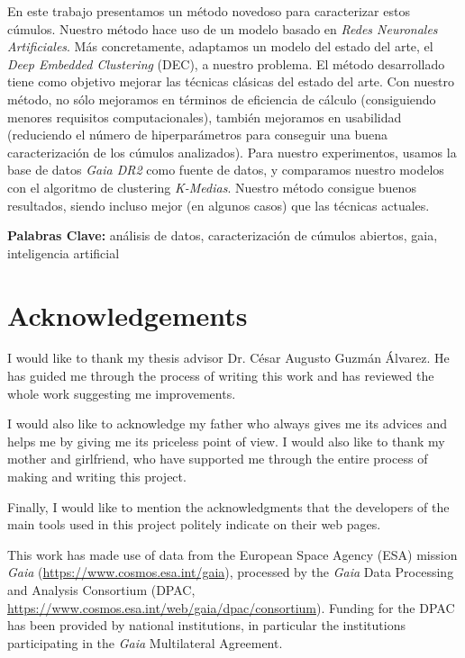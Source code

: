 \documentclass[11pt, a4paper, english]{book}
\begin{document}
En este trabajo presentamos un método novedoso para caracterizar estos cúmulos.
Nuestro método hace uso de un modelo basado en \emph{Redes Neuronales Artificiales}.
Más concretamente, adaptamos un modelo del estado del arte, el \emph{Deep Embedded
Clustering} (DEC), a nuestro problema. El método desarrollado tiene como objetivo
mejorar las técnicas clásicas del estado del arte. Con nuestro método, no sólo
mejoramos en términos de eficiencia de cálculo (consiguiendo menores requisitos
computacionales), también mejoramos en usabilidad (reduciendo el número de
hiperparámetros para conseguir una buena caracterización de los cúmulos analizados).
Para nuestro experimentos, usamos la base de datos \emph{Gaia DR2} como fuente de datos,
y comparamos nuestro modelos con el algoritmo de clustering \emph{K-Medias}. Nuestro
método consigue buenos resultados, siendo incluso mejor (en algunos casos) que las
técnicas actuales.

\medskip

{\bf Palabras Clave:} análisis de datos, caracterización de cúmulos abiertos, gaia, inteligencia artificial

\chapter{Acknowledgements}

I would like to thank my thesis advisor Dr. César Augusto Guzmán Álvarez.
He has guided me through the process of writing this work and has reviewed
the whole work suggesting me improvements.

I would also like to acknowledge my father who always gives me its advices and
helps me by giving me its priceless point of view. I would also like to thank
my mother and girlfriend, who have supported me through the entire process
of making and writing this project.

Finally, I would like to mention the acknowledgments that the developers
of the main tools used in this project politely indicate on their web pages.

\medskip

This work has made use of data from the European Space Agency (ESA) mission
{\it Gaia} (\url{https://www.cosmos.esa.int/gaia}), processed by the {\it Gaia}
Data Processing and Analysis Consortium (DPAC,
\url{https://www.cosmos.esa.int/web/gaia/dpac/consortium}). Funding for the DPAC
has been provided by national institutions, in particular the institutions
participating in the {\it Gaia} Multilateral Agreement.
\end{document}
